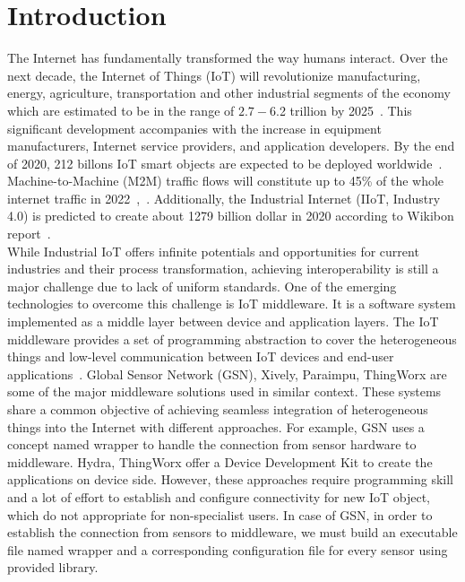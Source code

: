 \section{Introduction}
The Internet has fundamentally transformed the way humans interact. Over the next decade, the Internet of Things (IoT) will revolutionize manufacturing, energy, agriculture, transportation and other industrial segments of the economy which are estimated to be in the range of $2.7 - $6.2 trillion by 2025~\cite{manyika2013disruptive}. This significant development accompanies with the increase in equipment manufacturers, Internet service providers, and application developers. By the end of 2020, 212 billons IoT smart objects are expected to be deployed worldwide~\cite{gantz2012digital}. Machine-to-Machine (M2M) traffic flows will constitute up to 45\% of the whole internet traffic in 2022~\cite{taylor2013next},~\cite{evans2011internet}. Additionally, the Industrial Internet (IIoT, Industry 4.0) is predicted to create about 1279 billion dollar in 2020 according to Wikibon report~\cite{floyer2013defining}.\\

While Industrial IoT offers infinite potentials and opportunities for current industries and their process transformation, achieving interoperability is still a major challenge due to lack of uniform standards. One of the emerging technologies to overcome this challenge is IoT middleware. It is a software system implemented as a middle layer between device and application layers. The IoT middleware provides a set of programming abstraction to cover the heterogeneous things and low-level communication between IoT devices and end-user applications~\cite{fersi2015middleware}. Global Sensor Network (GSN), Xively, Paraimpu, ThingWorx are some of the major middleware solutions used in similar context. These systems share a common objective of achieving seamless integration of heterogeneous things into the Internet with different approaches. For example, GSN uses a concept named wrapper to handle the connection from sensor hardware to middleware. Hydra, ThingWorx offer a Device Development Kit to create the applications on device side. However, these approaches require programming skill and a lot of effort to establish and configure connectivity for new IoT object, which do not appropriate for non-specialist users. In case of GSN, in order to establish the connection from sensors to middleware, we must build an executable file named wrapper and a corresponding configuration file for every sensor using provided library. \\

